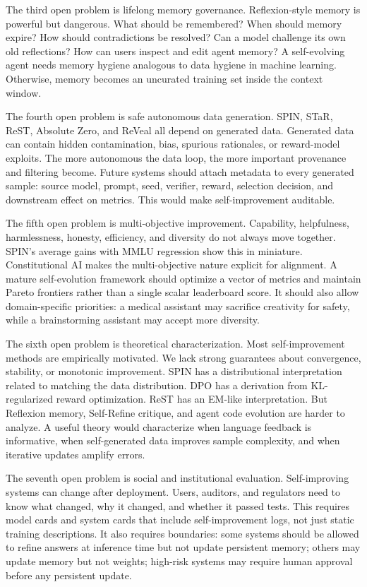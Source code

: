 The third open problem is lifelong memory governance. Reflexion-style memory is powerful but dangerous. What should be remembered? When should memory expire? How should contradictions be resolved? Can a model challenge its own old reflections? How can users inspect and edit agent memory? A self-evolving agent needs memory hygiene analogous to data hygiene in machine learning. Otherwise, memory becomes an uncurated training set inside the context window.

The fourth open problem is safe autonomous data generation. SPIN, STaR, ReST, Absolute Zero, and ReVeal all depend on generated data. Generated data can contain hidden contamination, bias, spurious rationales, or reward-model exploits. The more autonomous the data loop, the more important provenance and filtering become. Future systems should attach metadata to every generated sample: source model, prompt, seed, verifier, reward, selection decision, and downstream effect on metrics. This would make self-improvement auditable.

The fifth open problem is multi-objective improvement. Capability, helpfulness, harmlessness, honesty, efficiency, and diversity do not always move together. SPIN's average gains with MMLU regression show this in miniature. Constitutional AI makes the multi-objective nature explicit for alignment. A mature self-evolution framework should optimize a vector of metrics and maintain Pareto frontiers rather than a single scalar leaderboard score. It should also allow domain-specific priorities: a medical assistant may sacrifice creativity for safety, while a brainstorming assistant may accept more diversity.

The sixth open problem is theoretical characterization. Most self-improvement methods are empirically motivated. We lack strong guarantees about convergence, stability, or monotonic improvement. SPIN has a distributional interpretation related to matching the data distribution. DPO has a derivation from KL-regularized reward optimization. ReST has an EM-like interpretation. But Reflexion memory, Self-Refine critique, and agent code evolution are harder to analyze. A useful theory would characterize when language feedback is informative, when self-generated data improves sample complexity, and when iterative updates amplify errors.

The seventh open problem is social and institutional evaluation. Self-improving systems can change after deployment. Users, auditors, and regulators need to know what changed, why it changed, and whether it passed tests. This requires model cards and system cards that include self-improvement logs, not just static training descriptions. It also requires boundaries: some systems should be allowed to refine answers at inference time but not update persistent memory; others may update memory but not weights; high-risk systems may require human approval before any persistent update.


